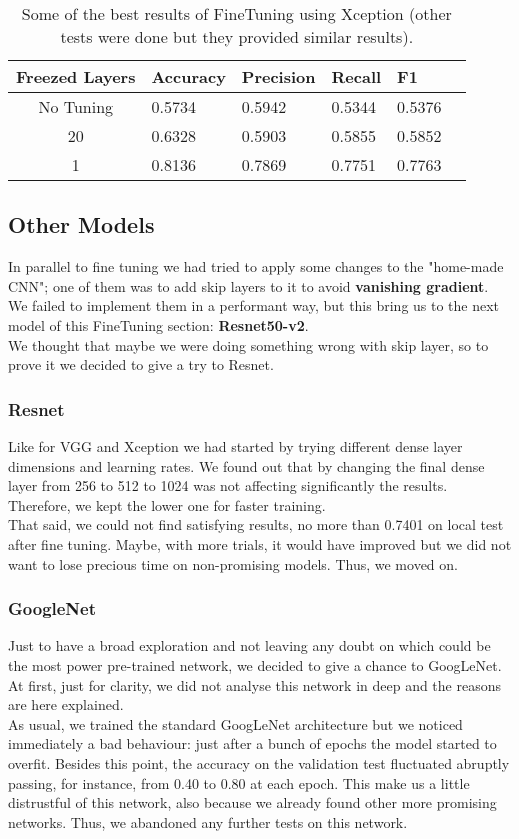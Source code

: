 \documentclass[11pt]{article}
\begin{document}
\begin{table}[ht]
  \centering
  \begin{adjustbox}{width=230}
  \small
  \begin{tabular}{|c|l|l|l|l|l}
  
  \hline \bf Freezed Layers & \bf Accuracy & \bf Precision & \bf Recall & \bf F1 \\ \hline
  No Tuning& 0.5734 & 0.5942 & 0.5344 & 0.5376\\
  20 & 0.6328 & 0.5903 & 0.5855 & 0.5852\\
  1 & 0.8136 & 0.7869 & 0.7751 & 0.7763\\
  \hline
  \end{tabular}
  \end{adjustbox}
  \caption{Some of the best results of FineTuning using Xception (other tests were done but they provided similar results).}
  \end{table}
\subsection{Other Models}
In parallel to fine tuning we had tried to apply some changes to the "home-made CNN"; one of them was to add skip layers to it to avoid \textbf{vanishing gradient}.\\[0.1cm]
We failed to implement them in a performant way, but this bring us to the next model of this FineTuning section: \textbf{Resnet50-v2}.\\[0.1cm] 
We thought that maybe we were doing something wrong with skip layer, so to prove it we decided to give a try to Resnet.
\subsubsection{Resnet}
Like for VGG and Xception we had started by trying different dense layer dimensions and learning rates. We found out that by changing the final dense layer from 256 to 512 to 1024 was not affecting significantly the results. Therefore, we kept the lower one for faster training.\\[0.1cm]
That said, we could not find satisfying results, no more than 0.7401 on local test after fine tuning. Maybe, with more trials, it would have improved but we did not want to lose precious time on non-promising models. Thus, we moved on.
\subsubsection{GoogleNet}
Just to have a broad exploration and not leaving any doubt on which could be the most power pre-trained network, we decided to give a chance to GoogLeNet. At first, just for clarity, we did not analyse this network in deep and the reasons are here explained.\\[0.1cm]
As usual, we trained the standard GoogLeNet architecture but we noticed immediately a bad behaviour: just after a bunch of epochs the model started to overfit. Besides this point, the accuracy on the validation test fluctuated abruptly passing, for instance, from 0.40 to 0.80 at each epoch. This make us a little distrustful of this network, also because we already found other more promising networks. Thus, we abandoned any further tests on this network.
\end{document}
